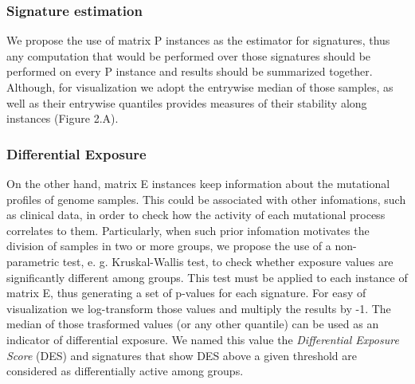 \documentclass{bioinfo}
\begin{document}
\subsubsection{Signature estimation}
We propose the use of matrix P instances as the estimator for signatures, thus 
any computation that would be performed over those signatures should be performed 
on every P instance and results should be summarized together. Although, for 
visualization we adopt the entrywise median of those samples, as well as their 
entrywise quantiles provides measures of their stability along instances (Figure 2.A).
\subsubsection{Differential Exposure}
On the other hand, matrix E instances keep information about the mutational 
profiles of genome samples. This could be associated with other infomations, 
such as clinical data, in order to check how the activity of each mutational 
process correlates to them. Particularly, when such prior infomation motivates 
the division of samples in two or more groups, we propose the use of a 
non-parametric test, e. g. Kruskal-Wallis test, to check whether exposure 
values are significantly different among groups. This test must be applied to 
each instance of matrix E, thus generating a set of p-values for each signature. 
For easy of visualization we log-transform those values and multiply the 
results by -1. The median of those trasformed values (or any other 
quantile) can be used as an indicator of differential exposure. We named this value the 
\textit{Differential Exposure Score} (DES) and signatures that show DES above a given 
threshold are considered as differentially active among groups.
\end{document}
